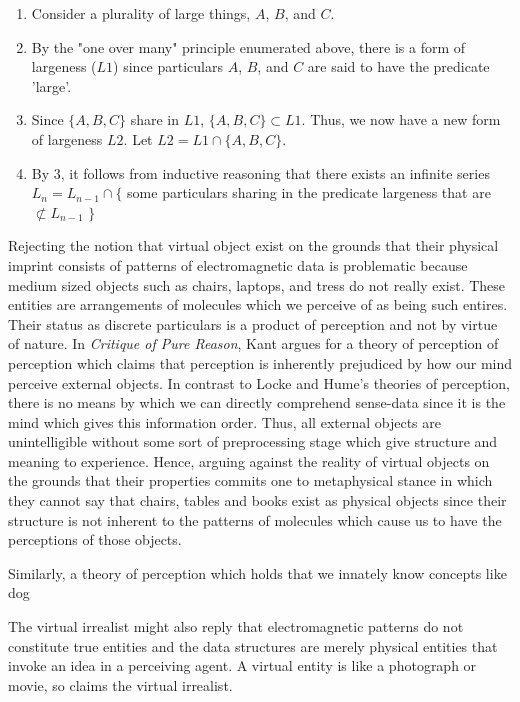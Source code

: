  \begin{enumerate}
 	\item Consider a plurality of large things, $A$, $B$, and $C$.
 	\item By the   "one over many" principle enumerated above, there is a form of largeness ($L1$) since particulars  $A$, $B$, and $C$ are said to have the predicate 'large'.  \cite{plato1921plato}
 	\item Since $\{A,B,C\}$  share in $L1$, $\{A,B,C\} \subset L1$. Thus, we now have a new form of largeness $L2$. Let $L2 =  L1 \cap \{A,B,C\}$.
	\item By $3$, it follows from inductive reasoning that there  exists an infinite series $L_{n} = L_{n-1} \cap \{$ some particulars sharing in the predicate largeness that are $\not\subset L_{n-1}$ $\}$	
 \end{enumerate}
Rejecting the notion that virtual object exist on the grounds that their physical imprint consists of patterns of electromagnetic data is problematic because medium sized objects such as chairs, laptops, and tress do not really exist. These entities are arrangements of molecules which we perceive of as being such entires. Their status as discrete particulars is a product of perception and not by virtue of nature. In \textit{Critique of Pure Reason}, Kant argues for a theory of perception of perception which claims that perception is inherently prejudiced by how our mind perceive external objects. In contrast to Locke and Hume's theories of perception, there is no means by which we can directly comprehend sense-data since it is the mind which gives this information order. \cite{thomson2012bacon} Thus, all external objects are unintelligible without some sort of preprocessing stage which give structure and meaning to experience. Hence, arguing against the reality of virtual objects on the grounds that their properties commits one to metaphysical stance in which they cannot say that chairs, tables and books exist as physical objects since their structure is not inherent to the patterns of molecules which cause us to have the perceptions of those objects.
\newline

Similarly, a theory of perception which holds that we innately know concepts like dog 

 The virtual irrealist might also reply that electromagnetic patterns do not constitute true entities and the data structures are merely physical entities that invoke an idea in a perceiving agent. A virtual entity is like a photograph or movie, so claims the virtual irrealist.   
 \newline 
  
